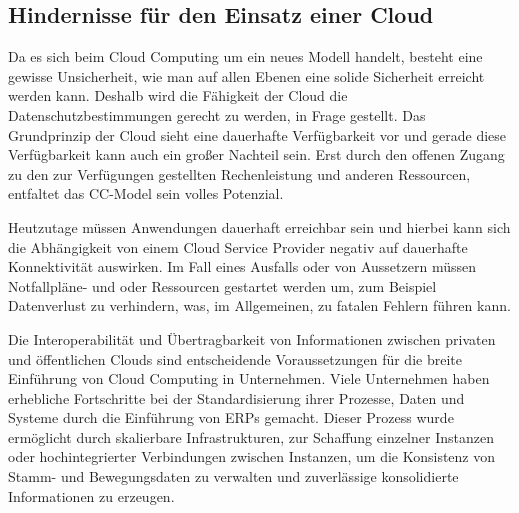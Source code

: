 \subsection{Hindernisse für den Einsatz einer Cloud}

Da es sich beim Cloud Computing um ein neues Modell handelt, besteht eine gewisse Unsicherheit, wie man auf allen Ebenen eine solide Sicherheit erreicht werden kann. Deshalb wird die Fähigkeit der Cloud die Datenschutzbestimmungen gerecht zu werden, in Frage gestellt. Das Grundprinzip der Cloud sieht eine dauerhafte Verfügbarkeit vor und gerade diese Verfügbarkeit kann auch ein großer Nachteil sein. Erst durch den offenen Zugang zu den zur Verfügungen gestellten Rechenleistung und anderen Ressourcen, entfaltet das CC-Model sein volles Potenzial. 

Heutzutage müssen Anwendungen dauerhaft erreichbar sein und hierbei kann sich die Abhängigkeit von einem Cloud Service Provider negativ auf dauerhafte Konnektivität auswirken. Im Fall eines Ausfalls oder von Aussetzern müssen Notfallpläne- und oder Ressourcen gestartet werden um, zum Beispiel Datenverlust zu verhindern, was, im Allgemeinen, zu fatalen Fehlern führen kann.

Die Interoperabilität und Übertragbarkeit von Informationen zwischen privaten und öffentlichen Clouds sind entscheidende Voraussetzungen für die breite Einführung von Cloud Computing in Unternehmen. Viele Unternehmen haben erhebliche Fortschritte bei der Standardisierung ihrer Prozesse, Daten und Systeme durch die Einführung von ERPs gemacht. Dieser Prozess wurde ermöglicht durch skalierbare Infrastrukturen, zur Schaffung einzelner Instanzen oder hochintegrierter Verbindungen zwischen Instanzen, um die Konsistenz von Stamm- und Bewegungsdaten zu verwalten und zuverlässige konsolidierte Informationen zu erzeugen.

